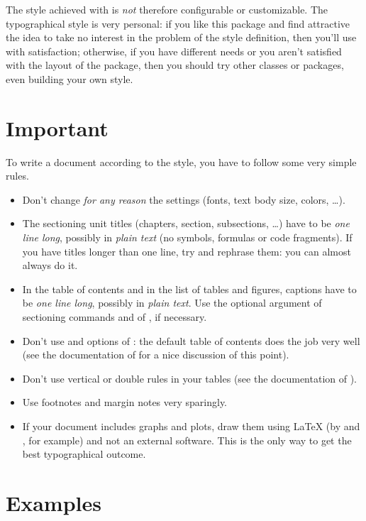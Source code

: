 The style achieved with \arsclassica{} is \emph{not} therefore configurable or customizable. The typographical style is very personal: if you like this package and find attractive the idea to take no interest in the problem of the style definition, then you'll use \arsclassica{} with satisfaction; otherwise, if you have different needs or you aren't satisfied with the layout of the package, then you should try other classes or packages, even building your own style.



\section{Important}

To write a document according to the \arsclassica{} style, you have to follow some very simple rules.
\begin{itemize}
\item Don't change \emph{for any reason} the \arsclassica{} settings (fonts, text body size, colors, \dots).
\item The sectioning unit titles (chapters, section, subsections, \dots) have to be \emph{one line long}, possibly in \emph{plain text} (no symbols, formulas or code fragments). If you have titles longer than one line, try and rephrase them: you can almost always do it.
\item In the table of contents and in the list of tables and figures, captions have to be \emph{one line long}, possibly in \emph{plain text}. Use the optional argument of sectioning commands and of , if necessary.
\item Don't use  and  options of \classicthesis: the default table of contents does the job very well (see the documentation of \classicthesis{} for a nice discussion of this point).
\item Don't use vertical or double rules in your tables (see the documentation of ).
\item Use footnotes and margin notes very sparingly.
\item If your document includes graphs and plots, draw them using \LaTeX{} (by  and , for example) and not an external software. This is the only way to get the best typographical outcome.
\end{itemize}



\section{Examples}

